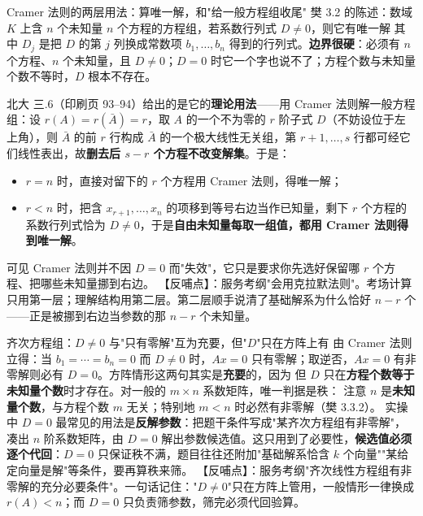 
\begin{fdeep}{Cramer 法则的两层用法：算唯一解，和"给一般方程组收尾"}
樊 3.2 的陈述：数域 $K$ 上含 $n$ 个未知量 $n$ 个方程的方程组，若系数行列式 $D\ne0$，则它有唯一解
其中 $D_j$ 是把 $D$ 的第 $j$ 列换成常数项 $b_1,\dots,b_n$ 得到的行列式。\textbf{边界很硬}：必须有 $n$ 个方程、$n$ 个未知量，且 $D\ne0$；$D=0$ 时它一个字也说不了；方程个数与未知量个数不等时，$D$ 根本不存在。

北大 三.6（印刷页 93–94）给出的是它的\textbf{理论用法}——用 Cramer 法则解一般方程组：设 $r(A)=r(\bar A)=r$，取 $A$ 的一个不为零的 $r$ 阶子式 $D$（不妨设位于左上角），则 $\bar A$ 的前 $r$ 行构成 $\bar A$ 的一个极大线性无关组，第 $r+1,\dots,s$ 行都可经它们线性表出，故\textbf{删去后 $s-r$ 个方程不改变解集}。于是：
\begin{itemize}[leftmargin=2.2em,itemsep=0.25em]
\item $r=n$ 时，直接对留下的 $r$ 个方程用 Cramer 法则，得唯一解；
\item $r<n$ 时，把含 $x_{r+1},\dots,x_n$ 的项移到等号右边当作已知量，剩下 $r$ 个方程的系数行列式恰为 $D\ne0$，于是\textbf{自由未知量每取一组值，都用 Cramer 法则得到唯一解}。
\end{itemize}
可见 Cramer 法则并不因 $D=0$ 而"失效"，它只是要求你先选好保留哪 $r$ 个方程、把哪些未知量挪到右边。
【反哺点】：服务考纲"会用克拉默法则"。考场计算只用第一层；理解结构用第二层。第二层顺手说清了基础解系为什么恰好 $n-r$ 个——正是被挪到右边当参数的那 $n-r$ 个未知量。
\end{fdeep}

\begin{fdeep}{齐次方程组：$D\ne0$ 与"只有零解"互为充要，但"$D$"只在方阵上有}
由 Cramer 法则立得：当 $b_1=\cdots=b_n=0$ 而 $D\ne0$ 时，$Ax=0$ 只有零解；取逆否，$Ax=0$ 有非零解则必有 $D=0$。方阵情形这两句其实是\textbf{充要}的，因为
但 $D$ 只在\textbf{方程个数等于未知量个数}时才存在。对一般的 $m\times n$ 系数矩阵，唯一判据是秩：
注意 $n$ 是\textbf{未知量个数}，与方程个数 $m$ 无关；特别地 $m<n$ 时必然有非零解（樊 3.3.2）。
实操中 $D=0$ 最常见的用法是\textbf{反解参数}：把题干条件写成"某齐次方程组有非零解"，凑出 $n$ 阶系数矩阵，由 $D=0$ 解出参数候选值。这只用到了必要性，\textbf{候选值必须逐个代回}：$D=0$ 只保证秩不满，题目往往还附加"基础解系恰含 $k$ 个向量""某给定向量是解"等条件，要再算秩来筛。
【反哺点】：服务考纲"齐次线性方程组有非零解的充分必要条件"。一句话记住："$D\ne0$"只在方阵上管用，一般情形一律换成 $r(A)<n$；而 $D=0$ 只负责筛参数，筛完必须代回验算。
\end{fdeep}

